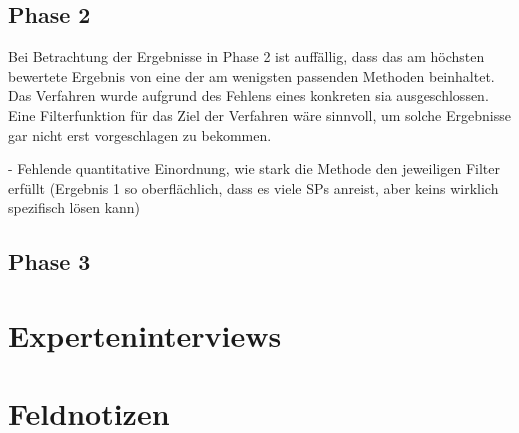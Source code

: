 \subsection{Phase 2}

Bei Betrachtung der Ergebnisse in Phase 2 ist auffällig, dass das am höchsten bewertete Ergebnis von  eine der am wenigsten passenden Methoden beinhaltet.
Das Verfahren wurde aufgrund des Fehlens eines konkreten \gls{sia} ausgeschlossen.
Eine Filterfunktion für das Ziel der Verfahren wäre sinnvoll, um solche Ergebnisse gar nicht erst vorgeschlagen zu bekommen.

 - Fehlende quantitative Einordnung, wie stark die Methode den jeweiligen Filter erfüllt (Ergebnis 1 so oberflächlich, dass es viele SPs anreist, aber keins wirklich spezifisch lösen kann)

\subsection{Phase 3}


\section{Experteninterviews}

\section{Feldnotizen}

